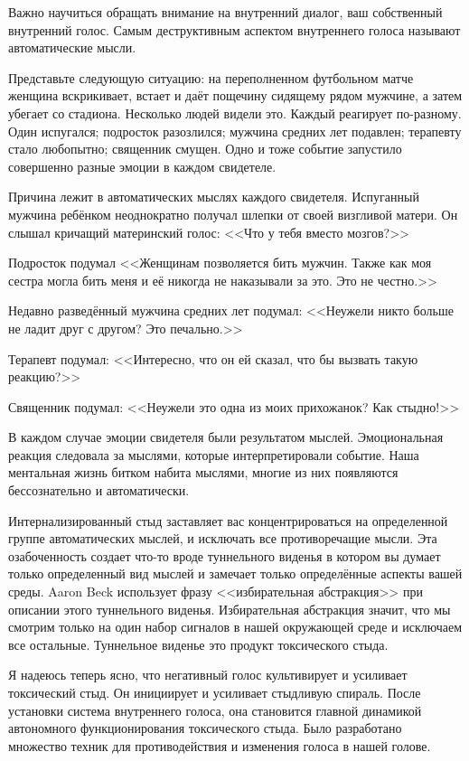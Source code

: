 \documentclass[10pt, fleqn]{article}
\begin{document}

Важно научиться обращать внимание на внутренний диалог, ваш собственный внутренний голос. Самым деструктивным аспектом внутреннего голоса называют автоматические мысли.

Представьте следующую ситуацию: на переполненном футбольном матче женщина вскрикивает, встает и даёт пощечину сидящему рядом мужчине, а затем убегает со стадиона. Несколько людей видели это. Каждый реагирует по-разному. Один испугался; подросток разозлился; мужчина средних лет подавлен; терапевту стало любопытно; священник смущен. Одно и тоже событие запустило совершенно разные эмоции в каждом свидетеле.

Причина лежит в автоматических мыслях каждого свидетеля. Испуганный мужчина ребёнком неоднократно получал шлепки от своей визгливой матери. Он слышал кричащий материнский голос: <<Что у тебя вместо мозгов?>>

Подросток подумал <<Женщинам позволяется бить мужчин. Также как моя сестра могла бить меня и её никогда не наказывали за это. Это не честно.>>

Недавно разведённый мужчина средних лет подумал: <<Неужели никто больше не ладит друг с другом? Это печально.>>

Терапевт подумал: <<Интересно, что он ей сказал, что бы вызвать такую реакцию?>>

Священник подумал: <<Неужели это одна из моих прихожанок? Как стыдно!>>

В каждом случае эмоции свидетеля были результатом мыслей. Эмоциональная реакция следовала за мыслями, которые интерпретировали событие. Наша ментальная жизнь битком набита мыслями, многие из них появляются бессознательно и автоматически.

Интернализированный стыд заставляет вас концентрироваться на определенной группе автоматических мыслей, и исключать все противоречащие мысли. Эта озабоченность создает что-то вроде туннельного виденья в котором вы думает только определенный вид мыслей и замечает только определённые аспекты вашей среды. Aaron Beck использует фразу <<избирательная абстракция>> при описании этого туннельного виденья. Избирательная абстракция значит, что мы смотрим только на один набор сигналов в нашей окружающей среде и исключаем все остальные. Туннельное виденье это продукт токсического стыда.


Я надеюсь теперь ясно, что негативный голос культивирует и усиливает токсический стыд. Он инициирует и усиливает стыдливую спираль. После установки система внутреннего голоса, она становится главной динамикой автономного функционирования токсического стыда. Было разработано множество техник для противодействия и изменения голоса в нашей голове.
\end{document}
